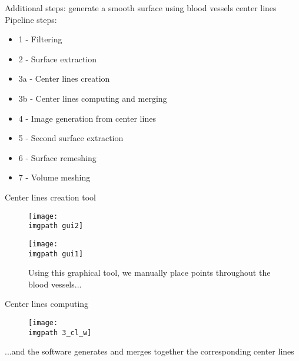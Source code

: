 \begin{frame}{Additional steps: generate a smooth surface using blood vessels center lines}
 Pipeline steps:
 \begin{center}
 \begin{itemize}
 	\item 1 - Filtering
 	\item 2 - Surface extraction
 	\item 3a - Center lines creation 
 	\item 3b - Center lines computing and merging
 	\item 4 - Image generation from center lines 
 	\item 5 - Second surface extraction
 	\item 6 - Surface remeshing
 	\item 7 - Volume meshing
 \end{itemize}
 \end{center}
\end{frame}


\begin{frame}{Center lines creation tool}
 \begin{center}
 \begin{figure}[H]
 	\begin{minipage}[b]{0.49\linewidth}
            	\centering
            	\texttt{[image: \\imgpath gui2]}
	\end{minipage}
	\hfill
	\begin{minipage}[b]{0.49\linewidth}
            	\centering
            	\texttt{[image: \\imgpath gui1]}
	\end{minipage}
	\caption*{\centering Using this graphical tool, we manually place points throughout the blood vessels...}
 \end{figure}
 \end{center}
\end{frame}


\begin{frame}{Center lines computing}
 \begin{center}
	\begin{figure}[H]
	\texttt{[image: \\imgpath 3\_cl\_w]}
	\caption*{}
 \end{figure}
 \vfill
 ...and the software generates and merges together the corresponding center lines
 \end{center}
\end{frame}

